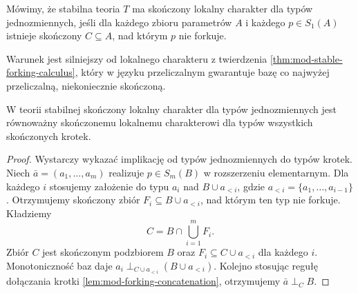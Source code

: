 \begin{definicja}
\label{def:mod-finite-local-character}
Mówimy, że stabilna teoria $T$ ma skończony
lokalny charakter dla typów jednozmiennych,
jeśli dla każdego zbioru parametrów $A$
i każdego $p\in S_1(A)$ istnieje
skończony $C\subseteq A$, nad którym
$p$ nie forkuje.
\end{definicja}

Warunek jest silniejszy od lokalnego charakteru
z twierdzenia \ref{thm:mod-stable-forking-calculus},
który w języku przeliczalnym gwarantuje bazę
co najwyżej przeliczalną, niekoniecznie skończoną.

\begin{lemat}
\label{lem:mod-finite-local-tuples}
W teorii stabilnej skończony lokalny charakter
dla typów jednozmiennych jest równoważny
skończonemu lokalnemu charakterowi dla typów
wszystkich skończonych krotek.
\end{lemat}
\begin{proof}
Wystarczy wykazać implikację od typów
jednozmiennych do typów krotek.
Niech $\bar a=(a_1,\ldots,a_m)$ realizuje
$p\in S_m(B)$ w rozszerzeniu elementarnym.
Dla każdego $i$ stosujemy założenie
do typu $a_i$ nad $B\cup a_{<i}$,
gdzie $a_{<i}=\{a_1,\ldots,a_{i-1}\}$.
Otrzymujemy skończony zbiór
$F_i\subseteq B\cup a_{<i}$, nad którym
ten typ nie forkuje. Kładziemy
\[
C=B\cap\bigcup_{i=1}^{m}F_i.
\]
Zbiór $C$ jest skończonym podzbiorem $B$
oraz $F_i\subseteq C\cup a_{<i}$ dla każdego $i$.
Monotoniczność baz daje
$a_i\mathrel{\perp_{C\cup a_{<i}}}(B\cup a_{<i})$.
Kolejno stosując regułę dołączania krotki
\ref{lem:mod-forking-concatenation}, otrzymujemy
$\bar a\mathrel{\perp_C}B$.
\end{proof}

